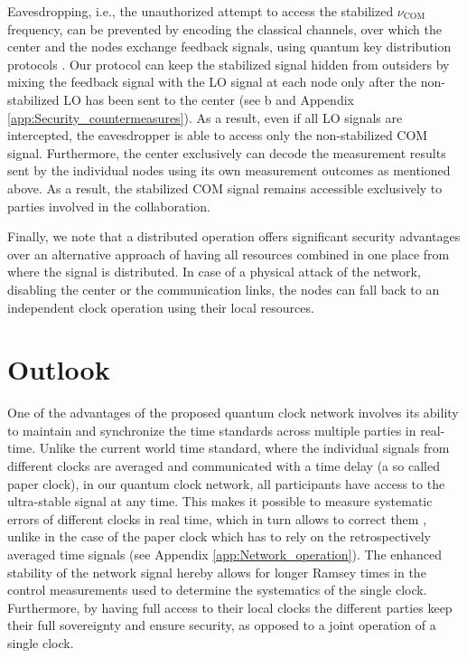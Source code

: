 Eavesdropping, i.e., the unauthorized attempt to access the stabilized
$\nu_\mathrm{COM}$ frequency, can be prevented by encoding the classical channels,
over which the center and the nodes exchange feedback signals, using quantum key
distribution protocols \cite{Gisin2002}. Our protocol can keep the stabilized
signal hidden from outsiders by mixing the feedback signal with the LO signal at each node only
after the non-stabilized LO has been sent to the center (see
b and Appendix \ref{app:Security_countermeasures}). As a result, even if  all LO signals are intercepted, the eavesdropper is able to access
only the non-stabilized COM signal. Furthermore, the center exclusively can decode the
measurement results sent by the individual nodes using its own measurement outcomes as mentioned above. 
As a result, the stabilized COM signal remains
accessible exclusively to parties involved in the collaboration.

Finally, we note that a distributed operation offers significant security
advantages over an alternative approach of having all resources combined in one
place from where the signal is distributed. In case of a physical attack of the
network, disabling the center or the communication links, the nodes can fall
back to an independent clock operation using their local resources.

\section{Outlook}

One of the advantages of the proposed quantum clock network involves its ability
to maintain and synchronize the time standards across multiple parties in
real-time. 
Unlike the current world time standard, where the individual signals from
different clocks are averaged and communicated with a time delay (a so called
paper clock), in our quantum clock network, all participants have access to the
ultra-stable signal at any time.
This makes it possible to measure systematic errors of different clocks in
real time, which in turn allows to correct them \cite{Bloom2013}, unlike in the
case of the paper clock which has to rely on the retrospectively averaged time 
signals (see Appendix \ref{app:Network_operation}). 
The enhanced stability of the network signal hereby allows for longer Ramsey
times in the control measurements used to determine the systematics of the
single clock.
Furthermore, by having full access to their local clocks the different parties
keep  their full sovereignty and ensure security, as opposed to a joint
operation of a single clock.

